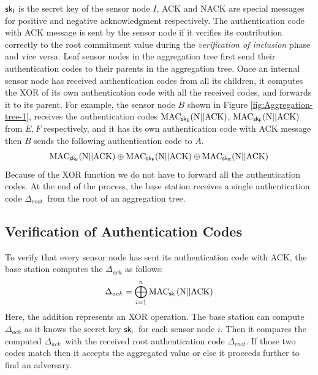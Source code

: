 		$\sf{sk}_{I}$ is the secret key of the sensor node $I$, ACK and NACK are special messages for positive and negative acknowledgment respectively.
		The authentication code with ACK message is sent by the sensor node if it verifies its contribution correctly to the root commitment value during the \textit{verification of inclusion} phase and vice versa.
		Leaf sensor nodes in the aggregation tree first send their authentication codes to their parents in the aggregation tree.
		Once an internal sensor node has received authentication codes from all its children, it computes the XOR of its own authentication code with all the received codes, and forwards it to its parent.
		For example, the sensor node $B$ shown in Figure \ref{fig:Aggregation-tree-1}, receives the authentication codes $\mbox{MAC}_{\sf{sk}_{E}}(\mbox{N}||\mbox{ACK})$, $\mbox{MAC}_{\sf{sk}_{F}}(\mbox{N}||\mbox{ACK})$ from $E,F$ respectively, and it has its own authentication code with ACK message then $B$ sends the following authentication code to $A$.
		\begin{equation*}
			\mbox{MAC}_{\sf{sk}_{E}}(\mbox{N}||\mbox{ACK}) \oplus \mbox{MAC}_{\sf{sk}_{F}}(\mbox{N}||\mbox{ACK}) \oplus \mbox{MAC}_{\sf{sk}_{B}}(\mbox{N}||\mbox{ACK})
		\end{equation*}
		Because of the XOR function we do not have to forward all the authentication codes. 
		At the end of the process, the base station receives a single authentication code $\Delta_{root}$\ from the root of an aggregation tree.

	\subsection{Verification of Authentication Codes}
		\label{sec:verficiation-of-authentication-codes}
		
		To verify that every sensor node has sent its authentication code with ACK, the base station computes the $\Delta_{ack}$ as follows:
		\begin{equation}
			\label{eq:mac-auth}
			\displaystyle{\Delta_{ack} = \bigoplus_{i = 1}^n \mbox{MAC}_{\sf{sk}_{i}}(\mbox{N} || \mbox{ACK}) }
		\end{equation}
		Here, the addition represents an XOR operation.
		The base station can compute $\Delta_{ack}$ as it knows the secret key $\sf{sk}_{i}$\ for each sensor node $i$.
		Then it compares the computed $\Delta_{ack}$\ with the received root authentication code $\Delta_{root}$. 
		If those two codes match then it accepts the aggregated value or else it proceeds further to find an adversary. 

